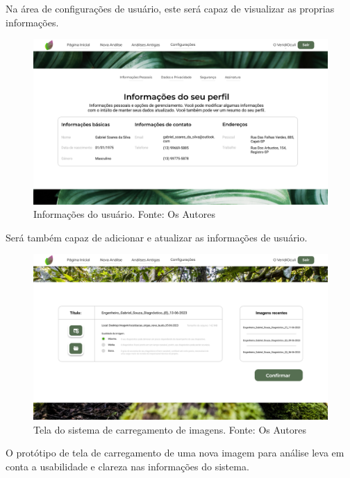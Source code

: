 \documentclass[
  a4paper,%
  12pt,%
  english,%
  brazilian,%
]{article}
\begin{document}
Na área de configurações de usuário, este será capaz de visualizar as proprias informações.


\begin{figure}[H]
    \centering
    \includegraphics[width=.7\textwidth,keepaspectratio]{Logos/tela_configurações.png}
    \caption{Informações do usuário. Fonte: Os Autores}
    \label{fig:my_label}
\end{figure}


Será também capaz de adicionar e atualizar as informações de usuário.

\begin{figure}[H]
    \centering
    \includegraphics[width=\textwidth,keepaspectratio]{Logos/tela_subir_imagem.png}
    \caption{Tela do sistema de carregamento de imagens. Fonte: Os Autores}
    \label{fig:my_label}
\end{figure}

O protótipo de tela de carregamento de uma nova imagem para análise leva em conta a usabilidade e clareza nas informações do sistema.
\end{document}
